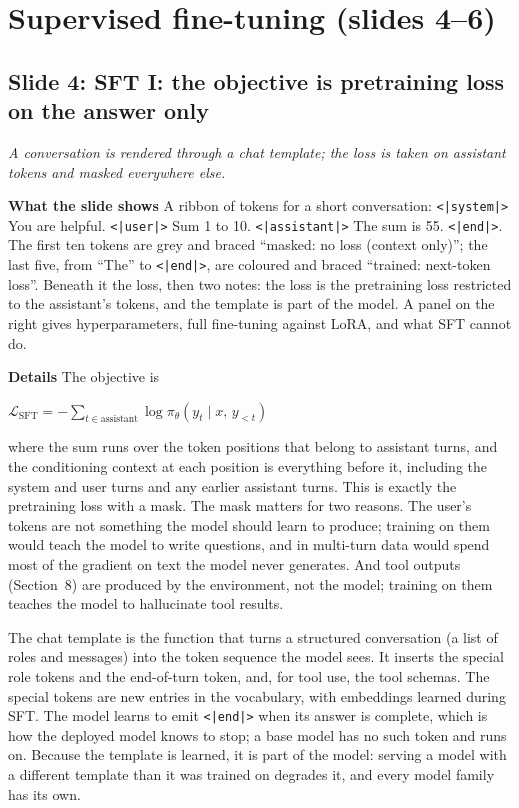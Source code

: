\documentclass[11pt,letterpaper]{article}
\newcommand{\slide}[3]{%
  \subsection[Slide #1: #2]{Slide #1: #2}%
  {\color{muted}\itshape #3\par}\medskip}
\newcommand{\para}[1]{\medskip\noindent\textbf{#1}\quad}
\newenvironment{formulas}{\begin{tcolorbox}[formulabox]}{\end{tcolorbox}}
\newcommand{\pit}{\pi_\theta}\newcommand{\KL}{\mathrm{KL}}
\begin{document}
\section{Supervised fine-tuning (slides 4--6)}

\slide{4}{SFT I: the objective is pretraining loss on the answer only}{A conversation is rendered through a chat template; the loss is taken on assistant tokens and masked everywhere else.}

\para{What the slide shows} A ribbon of tokens for a short conversation: \texttt{<|system|>} You are helpful. \texttt{<|user|>} Sum 1 to 10. \texttt{<|assistant|>} The sum is 55. \texttt{<|end|>}. The first ten tokens are grey and braced ``masked: no loss (context only)''; the last five, from ``The'' to \texttt{<|end|>}, are coloured and braced ``trained: next-token loss''. Beneath it the loss, then two notes: the loss is the pretraining loss restricted to the assistant's tokens, and the template is part of the model. A panel on the right gives hyperparameters, full fine-tuning against LoRA, and what SFT cannot do.

\para{Details} The objective is
\begin{formulas}
$\mathcal{L}_{\text{SFT}}=-\displaystyle\sum_{t\in\text{assistant}}\log\pit(y_t\mid x,\,y_{<t})$
\end{formulas}
where the sum runs over the token positions that belong to assistant turns, and the conditioning context at each position is everything before it, including the system and user turns and any earlier assistant turns. This is exactly the pretraining loss with a mask. The mask matters for two reasons. The user's tokens are not something the model should learn to produce; training on them would teach the model to write questions, and in multi-turn data would spend most of the gradient on text the model never generates. And tool outputs (Section~8) are produced by the environment, not the model; training on them teaches the model to hallucinate tool results.

The chat template is the function that turns a structured conversation (a list of roles and messages) into the token sequence the model sees. It inserts the special role tokens and the end-of-turn token, and, for tool use, the tool schemas. The special tokens are new entries in the vocabulary, with embeddings learned during SFT. The model learns to emit \texttt{<|end|>} when its answer is complete, which is how the deployed model knows to stop; a base model has no such token and runs on. Because the template is learned, it is part of the model: serving a model with a different template than it was trained on degrades it, and every model family has its own.
\end{document}

